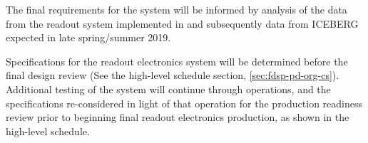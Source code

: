 The final requirements for the system will be informed by analysis of the data from the readout system implemented in  and subsequently data from ICEBERG expected in late spring/summer 2019.


Specifications for the readout electronics system will be determined before the  final design review (See the high-level schedule section, \ref{sec:fdsp-pd-org-cs}).  Additional testing of the system will continue through  operations, and the specifications re-considered in light of that operation for the production readiness review prior to beginning final readout electronics production, as shown in the high-level schedule.




